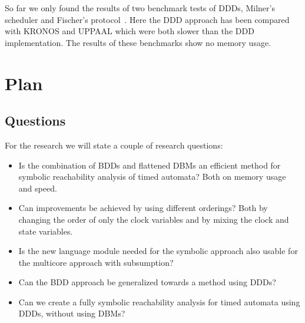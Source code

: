 \documentclass[11pt]{article}
\begin{document}
So far we only found the results of two benchmark tests of DDDs, Milner's scheduler and Fischer's protocol~\cite{Møller200253}. Here the DDD approach has been compared with KRONOS and UPPAAL which were both slower than the DDD implementation. The results of these benchmarks show no memory usage.  

\section{Plan}

\subsection{Questions}
For the research we will state a couple of research questions:
{\renewcommand\labelitemi{--}
	\begin{itemize}
		\item Is the combination of BDDs and flattened DBMs an efficient method for symbolic reachability analysis of timed automata? Both on memory usage and speed.
		\item Can improvements be achieved by using different orderings? Both by changing the order of only the clock variables and by mixing the clock and state variables.
		\item Is the new language module needed for the symbolic approach also usable for the multicore approach with subsumption?
		\item Can the BDD approach be generalized towards a method using DDDs?
		\item Can we create a fully symbolic reachability analysis for timed automata using DDDs, without using DBMs?
	\end{itemize}
}
\end{document}
